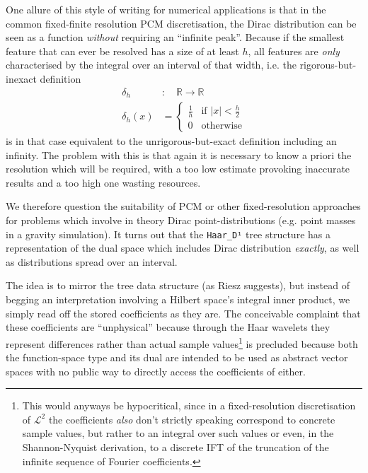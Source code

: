 \documentclass[sigplan,review,anonymous]{acmart}\settopmatter{printfolios=true,printccs=false,printacmref=false}
\theoremstyle{acmplain}
\theoremstyle{acmdefinition}
\begin{document}
One allure of this style of writing for numerical applications is that in the common fixed-finite resolution PCM discretisation, the Dirac distribution can be seen as a function \emph{without} requiring an “infinite peak”. Because if the smallest feature that can ever be resolved has a size of at least $h$, all features are \emph{only} characterised by the integral over an interval of that width, i.e. the rigorous-but-inexact definition
\begin{align*}
  \delta_h &:\quad \mathbb{R} \to \mathbb{R}
 \\
  \delta_h(x) &= \begin{cases} \frac1h & \text{if }|x|<\tfrac{h}2
                          \\ 0         & \text{otherwise} \end{cases}
\end{align*}
is in that case equivalent to the unrigorous-but-exact definition including an infinity. The problem with this is that again it is necessary to know a priori the resolution which will be required, with a too low estimate provoking inaccurate results and a too high one wasting resources.

We therefore question the suitability of PCM or other fixed-resolution approaches for problems which involve in theory Dirac point-distributions (e.g. point masses in a gravity simulation). It turns out that the \lstinline`Haar_D¹` tree structure has a representation of the dual space which includes Dirac distribution \emph{exactly}, as well as distributions spread over an interval.

The idea is to mirror the tree data structure (as Riesz suggests), but instead of begging an interpretation involving a Hilbert space's integral inner product, we simply read off the stored coefficients as they are. The conceivable complaint that these coefficients are “unphysical” because through the Haar wavelets they represent differences rather than actual sample values\footnote{%
This would anyways be hypocritical, since in a fixed-resolution discretisation of $\mathcal{L}^2$ the coefficients \emph{also} don't strictly speaking correspond to concrete sample values, but rather to an integral over such values or even, in the Shannon-Nyquist derivation, to a discrete IFT of the truncation of the infinite sequence of Fourier coefficients.
} is precluded because both the function-space type and its dual are intended to be used as abstract vector spaces with no public way to directly access the coefficients of either.
\end{document}
